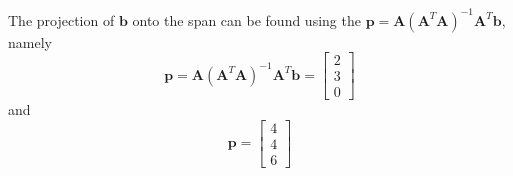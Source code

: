 \begin{mdframed}[style=MyFrame]
    The projection of $\mathbf{b}$ onto the span can be found using the
    $\mathbf{p} =
    \mathbf{A}(\mathbf{A}^{T}\mathbf{A})^{-1}\mathbf{A}^{T}\mathbf{b}$,
    namely 
    \begin{equation}
        \mathbf{p}  =
                    \mathbf{A}(\mathbf{A}^{T}\mathbf{A})^{-1}\mathbf{A}^{T}\mathbf{b}               
                    =
                    \begin{bmatrix}
                        2   \\
                        3   \\
                        0
                    \end{bmatrix}
    \end{equation}
    and
    \begin{equation}
        \mathbf{p}  =
                    \begin{bmatrix}
                        4   \\
                        4   \\
                        6
                    \end{bmatrix}
    \end{equation}
\end{mdframed}
